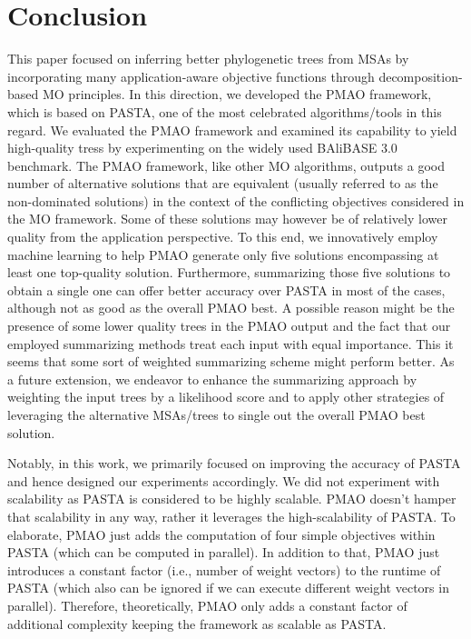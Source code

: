 \documentclass[a4paper,fleqn, review]{cas-dc}
\begin{document}
\section{Conclusion}
This paper focused on inferring better phylogenetic trees from MSAs by incorporating many application-aware objective functions through decomposition-based MO principles. In this direction, we developed the PMAO framework, which is based on PASTA, one of the most celebrated algorithms/tools in this regard. We evaluated the PMAO framework and examined its capability to yield high-quality tress by experimenting on the widely used BAliBASE 3.0 benchmark. The PMAO framework, like other MO algorithms, outputs a good number of alternative solutions that are equivalent (usually referred to as the non-dominated solutions) in the context of the conflicting objectives considered in the MO framework. Some of these solutions may however be of relatively lower quality from the application perspective. To this end, we innovatively employ machine learning to help PMAO generate only five solutions encompassing at least one top-quality solution. Furthermore, summarizing those five solutions to obtain a single one can offer better accuracy over PASTA in most of the cases, although not as good as the overall PMAO best. A possible reason might be the presence of some lower quality trees in the PMAO output and the fact that our employed summarizing methods treat each input with equal importance. This it seems that some sort of weighted summarizing scheme might perform better. As a future extension, we endeavor to enhance the summarizing approach by weighting the input trees by a likelihood score and to apply other strategies of leveraging the alternative MSAs/trees to single out the overall PMAO best solution.

Notably, in this work, we primarily focused on improving the accuracy of PASTA and hence designed our experiments accordingly. We did not experiment with scalability as PASTA is considered to be highly scalable. PMAO doesn’t hamper that scalability in any way, rather it leverages the high-scalability of PASTA. To elaborate, PMAO just adds the computation of four simple objectives within PASTA (which can be computed in parallel). In addition to that, PMAO just introduces a constant factor (i.e., number of weight vectors) to the runtime of PASTA (which also can be ignored if we can execute different weight vectors in parallel). Therefore, theoretically, PMAO only adds a constant factor of additional complexity keeping the framework as scalable as PASTA. %
\end{document}

